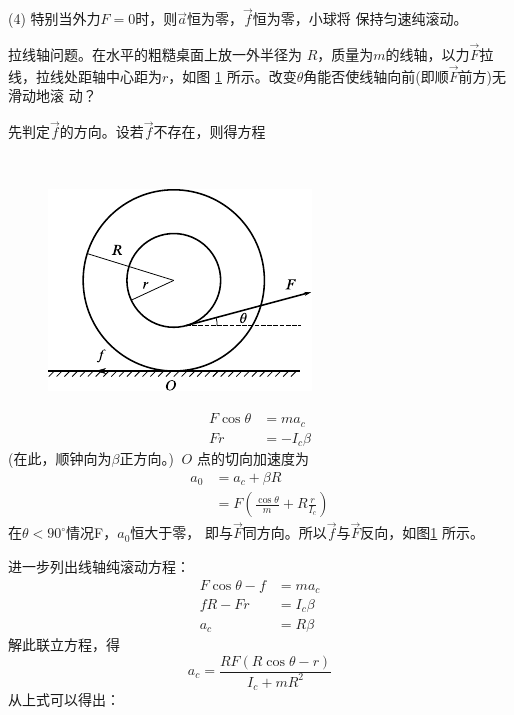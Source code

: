 (4) 特别当外力$ F=0 $时，则$ \vec{a} $恒为零，$ \vec{f} $恒为零，小球将
保持匀速纯滚动。

\example 拉线轴问题。在水平的粗糙桌面上放一外半径为
$ R $，质量为$ m $的线轴，以力$ \vec{F} $拉线，拉线处距轴中心距为$ r $，如图
\ref{fig:10.19} 所示。改变$ \theta $角能否使线轴向前(即顺$ \vec{F} $前方)无滑动地滚
动？

\solution 先判定$ \vec{f} $的方向。设若$ \vec{f} $不存在，则得方程

~
\begin{figure}
    \centering
    \includegraphics{figure/fig10.19}
    \caption{}
    \label{fig:10.19}
\end{figure}
\begin{equation*}
    \begin{split}
        F \cos \theta &= m a _ c \\
        F r &= - I _ { c } \beta
    \end{split}
\end{equation*}
(在此，顺钟向为$ \beta $正方向。\!\!) $~ O $
点的切向加速度为
\begin{equation*}
    \begin{split}
        a _ { 0 } &= a _ { c } + \beta R \\
                  &= F \left( \frac { \cos \theta } { m } + R \frac { r } { I _ { c } } \right)
    \end{split}
\end{equation*}
在$ \theta < 90 ^ \circ $情况F，$ a _ 0 $恒大于零，
即与$ \vec{F} $同方向。所以$\vec{f}$与$\vec{F}$反向，如图\ref{fig:10.19} 所示。

进一步列出线轴纯滚动方程：
\begin{equation*}
    \begin{split}
        F \cos \theta - f &= m a _ { c } \\
        f R - F r &= I _ { c } \beta \\
        a _ { c } &= R \beta
    \end{split}
\end{equation*}
解此联立方程，得
\begin{equation*}
    a _ { c } = \frac { R F \left( R \cos \theta - r \right) } { I _ { c } + m R ^ { 2 } }
\end{equation*}
从上式可以得出：


